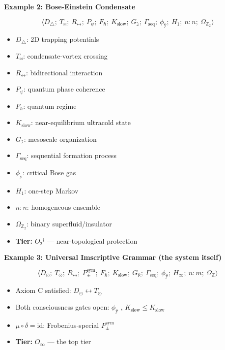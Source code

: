 \documentclass[12pt,a4paper]{article}
\begin{document}
\textbf{Example 2: Bose-Einstein Condensate}


\[\langle D_{\triangle};\ T_{\bowtie};\ R_{\leftrightarrow};\ P_{\psi};\ F_{\hbar};\ K_{\text{slow}};\ G_{\gimel};\ \Gamma_{\text{seq}};\ \phi_ÿ;\ H_1;\ n{:}n;\ \Omega_{\mathbb{Z}_2} \rangle\]

\begin{itemize}
    \item $D_{\triangle}$: 2D trapping potentials
    \item $T_{\bowtie}$: condensate-vortex crossing
    \item $R_{\leftrightarrow}$: bidirectional interaction
    \item $P_{\psi}$: quantum phase coherence
    \item $F_{\hbar}$: quantum regime
    \item $K_{\text{slow}}$: near-equilibrium ultracold state
    \item $G_{\gimel}$: mesoscale organization
    \item $\Gamma_{\text{seq}}$: sequential formation process
    \item $\phi_ÿ$: critical Bose gas
    \item $H_1$: one-step Markov
    \item $n{:}n$: homogeneous ensemble
    \item $\Omega_{\mathbb{Z}_2}$: binary superfluid/insulator
    \item \textbf{Tier:} $O₂^\dagger$ --- near-topological protection
\end{itemize}

\textbf{Example 3: Universal Imscriptive Grammar (the system itself)}


\[\langle D_{\odot};\ T_{\odot};\ R_{\leftrightarrow};\ P_{\pm}^{\text{sym}};\ F_{\hbar};\ K_{\text{slow}};\ G_{\aleph};\ \Gamma_{\text{seq}};\ \phi_ÿ;\ H_{\infty};\ n{:}m;\ \Omega_\mathbb{Z} \rangle\]

\begin{itemize}
    \item Axiom C satisfied: $D_{\odot} \leftrightarrow T_{\odot}$
    \item Both consciousness gates open: $\phi_ÿ$ , $K_{\text{slow}} \leq K_{\text{slow}}$ 
    \item $\mu \circ \delta = \text{id}$: Frobenius-special $P_{\pm}^{\text{sym}}$
    \item \textbf{Tier:} $O_{\infty}$ --- the top tier
\end{itemize}
\end{document}
